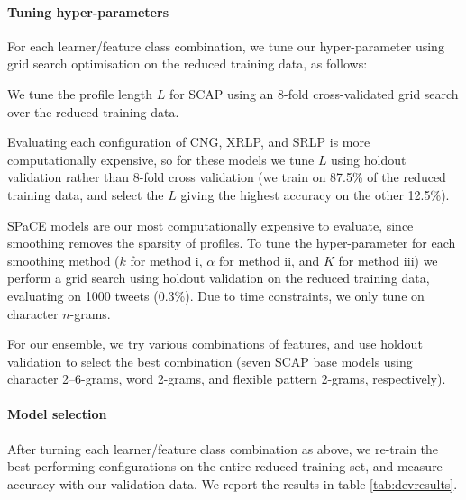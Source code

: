 \documentclass[twocolumn,10pt]{article}
\begin{document}

\paragraph{Tuning hyper-parameters}

For each learner/feature class combination, we tune our hyper-parameter
using grid search optimisation on the reduced training data, as follows:

We tune the profile length $L$ for SCAP using an 8-fold cross-validated
grid search over the reduced training data.

Evaluating each configuration of CNG, XRLP, and SRLP is more
computationally expensive, so for these models we tune $L$ using
holdout validation rather than 8-fold cross validation
(we train on 87.5\% of the reduced training data, and select the $L$
giving the highest accuracy on the other 12.5\%).

SPaCE models are our most computationally expensive to evaluate,
since smoothing removes the sparsity of profiles.
To tune the hyper-parameter for each smoothing method
($k$ for method i, $\alpha$ for method ii, and $K$ for method iii)
we perform a grid search using holdout validation on the reduced training
data, evaluating on 1000 tweets (0.3\%).
Due to time constraints, we only tune on character $n$-grams.

For our ensemble, we try various combinations of features, and use
holdout validation to select the best combination
(seven SCAP base models using character 2--6-grams, word 2-grams,
and flexible pattern 2-grams, respectively).


\paragraph{Model selection}
After turning each learner/feature class combination as above,
we re-train the best-performing configurations on the entire
reduced training set, and measure accuracy with our validation
data. We report the results in table \ref{tab:devresults}.
\end{document}
